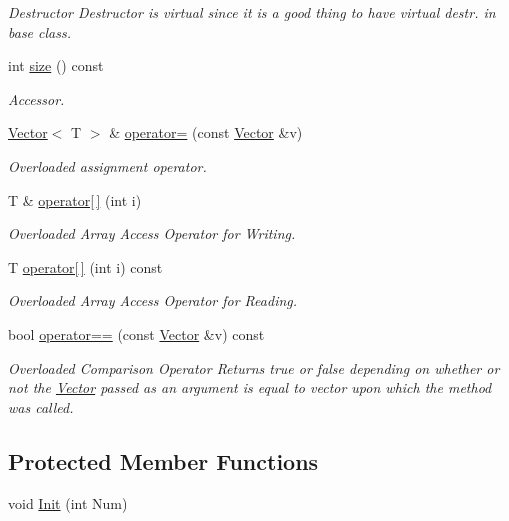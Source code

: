 \begin{DoxyCompactItemize}
\begin{DoxyCompactList}\small\item\em Destructor Destructor is virtual since it is a good thing to have virtual destr. in base class. \end{DoxyCompactList}\item 
int \hyperlink{class_vector_a18605418864723aa92c05bf69b146cc0}{size} () const 
\begin{DoxyCompactList}\small\item\em Accessor. \end{DoxyCompactList}\item 
\hyperlink{class_vector}{Vector}$<$ T $>$ \& \hyperlink{class_vector_a8c9731bbac936dea6af37aec6cd8425f}{operator=} (const \hyperlink{class_vector}{Vector} \&v)
\begin{DoxyCompactList}\small\item\em Overloaded assignment operator. \end{DoxyCompactList}\item 
T \& \hyperlink{class_vector_ada36811f9a98443820d1ebea0e36a429}{operator\mbox{[}$\,$\mbox{]}} (int i)
\begin{DoxyCompactList}\small\item\em Overloaded Array Access Operator for Writing. \end{DoxyCompactList}\item 
T \hyperlink{class_vector_a48fceb9501ec9d624970a5e8c4190859}{operator\mbox{[}$\,$\mbox{]}} (int i) const 
\begin{DoxyCompactList}\small\item\em Overloaded Array Access Operator for Reading. \end{DoxyCompactList}\item 
bool \hyperlink{class_vector_ad422451181e74e97da2db1d30982064b}{operator==} (const \hyperlink{class_vector}{Vector} \&v) const 
\begin{DoxyCompactList}\small\item\em Overloaded Comparison Operator Returns true or false depending on whether or not the \hyperlink{class_vector}{Vector} passed as an argument is equal to vector upon which the method was called. \end{DoxyCompactList}\end{DoxyCompactItemize}
\subsection*{Protected Member Functions}
\begin{DoxyCompactItemize}
\item 
void \hyperlink{class_vector_a114f401deb94c24ec98f6a85034cf369}{Init} (int Num)
\end{DoxyCompactItemize}
